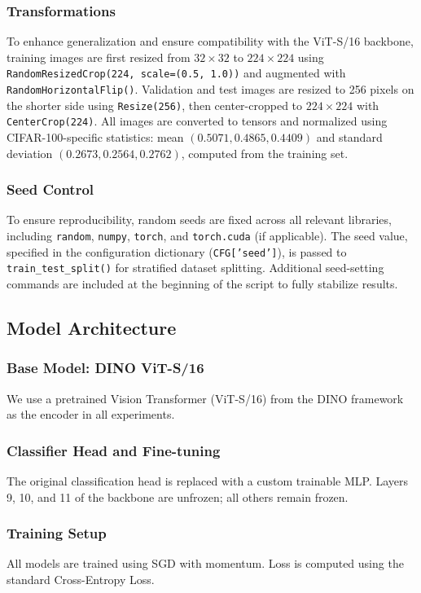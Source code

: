 \documentclass[10pt,twocolumn,letterpaper]{article}
\begin{document}
\subsubsection{Transformations}
To enhance generalization and ensure compatibility with the ViT-S/16 backbone, training images are first resized from $32{\times}32$ to $224{\times}224$ using \texttt{RandomResizedCrop(224, scale=(0.5, 1.0))} and augmented with \texttt{RandomHorizontalFlip()}. Validation and test images are resized to 256 pixels on the shorter side using \texttt{Resize(256)}, then center-cropped to $224{\times}224$ with \texttt{CenterCrop(224)}. All images are converted to tensors and normalized using CIFAR-100-specific statistics: mean $(0.5071, 0.4865, 0.4409)$ and standard deviation $(0.2673, 0.2564, 0.2762)$, computed from the training set.

\subsubsection{Seed Control}
To ensure reproducibility, random seeds are fixed across all relevant libraries, including \texttt{random}, \texttt{numpy}, \texttt{torch}, and \texttt{torch.cuda} (if applicable). The seed value, specified in the configuration dictionary (\texttt{CFG['seed']}), is passed to \texttt{train\_test\_split()} for stratified dataset splitting. Additional seed-setting commands are included at the beginning of the script to fully stabilize results.


\subsection{Model Architecture}
\subsubsection{Base Model: DINO ViT-S/16}
We use a pretrained Vision Transformer (ViT-S/16) from the DINO framework as the encoder in all experiments.

\subsubsection{Classifier Head and Fine-tuning}
The original classification head is replaced with a custom trainable MLP. Layers 9, 10, and 11 of the backbone are unfrozen; all others remain frozen.

\subsubsection{Training Setup}
All models are trained using SGD with momentum. Loss is computed using the standard Cross-Entropy Loss.
\end{document}
